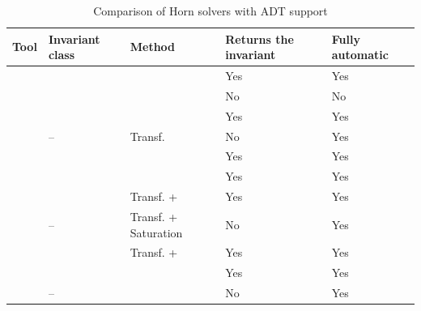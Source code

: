 \begin{table} [htbp]
    \centering
    \begin{threeparttable}%
        \caption{Comparison of Horn solvers with ADT support}\label{tab:hornSolvers}%
        \begin{tabular}{| m{41mm} || x{29mm} | x{28mm} | x{27mm} | x{26mm} |}
            \hline
            \hline
Tool & Invariant class & Method & Returns the invariant & Fully automatic\\\hline\hline
\spacer{} & \elemclass{} & \pdr{} & Yes & Yes\\
\racer{} & \catelemclass{} & \pdr{} & No & No\\
\eldarica{} & \sizeelemclass{} & \cegar{} & Yes & Yes\\
\vericat{} & -- & Transf. & No & Yes\\
\hoice{} & \elemclass{} & \ice{} & Yes & Yes\\
\rchc{}  & \syncRegFlatClass{} & \ice{} & Yes & Yes\\\hline
\ringenShort{\cvc} & \regclass{} & Transf. + \fmf{} & Yes & Yes\\
\ringenShort{\vampire} & -- & Transf. + Saturation & No & Yes\\
\ringenSyncShort{} & \syncRegFullClass{} & Transf. + \fmf{} & Yes & Yes\\
\ringenCICIShort{\cvc} & \regelemclass{} & \ourCEGAR{} & Yes & Yes\\
\ringenCICIShort{\vampire} & -- & \ourCEGAR{} & No & Yes\\
            \hline
            \hline
        \end{tabular}
    \end{threeparttable}
\end{table}

